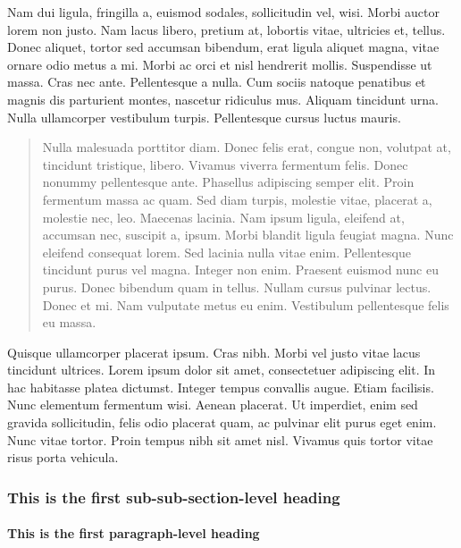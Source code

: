 Nam dui ligula, fringilla a, euismod sodales, sollicitudin vel, wisi. Morbi auctor
lorem non justo. Nam lacus libero, pretium at, lobortis vitae, ultricies et, tellus. Donec
aliquet, tortor sed accumsan bibendum, erat ligula aliquet magna, vitae ornare odio
metus a mi. Morbi ac orci et nisl hendrerit mollis. Suspendisse ut massa. Cras nec ante.
Pellentesque a nulla. Cum sociis natoque penatibus et magnis dis parturient montes,
nascetur ridiculus mus. Aliquam tincidunt urna. Nulla ullamcorper vestibulum turpis.
Pellentesque cursus luctus mauris.

\begin{quote}
Nulla malesuada porttitor diam. Donec felis erat, congue non, volutpat
at, tincidunt tristique, libero. Vivamus viverra fermentum felis. Donec
nonummy pellentesque ante. Phasellus adipiscing semper elit. Proin
fermentum massa ac quam. Sed diam turpis, molestie vitae, placerat
a, molestie nec, leo. Maecenas lacinia. Nam ipsum ligula, eleifend at,
accumsan nec, suscipit a, ipsum. Morbi blandit ligula feugiat magna.
Nunc eleifend consequat lorem. Sed lacinia nulla vitae enim. Pellentesque
tincidunt purus vel magna. Integer non enim. Praesent euismod nunc eu
purus. Donec bibendum quam in tellus. Nullam cursus pulvinar lectus.
Donec et mi. Nam vulputate metus eu enim. Vestibulum pellentesque
felis eu massa.
\end{quote}

Quisque ullamcorper placerat ipsum. Cras nibh. Morbi vel justo vitae lacus tincidunt
ultrices. Lorem ipsum dolor sit amet, consectetuer adipiscing elit. In hac habitasse
platea dictumst. Integer tempus convallis augue. Etiam facilisis. Nunc elementum
fermentum wisi. Aenean placerat. Ut imperdiet, enim sed gravida sollicitudin, felis
odio placerat quam, ac pulvinar elit purus eget enim. Nunc vitae tortor. Proin tempus
nibh sit amet nisl. Vivamus quis tortor vitae risus porta vehicula.

\subsubsection{This is the first sub-sub-section-level heading}

\lipsum[1]

\paragraph{This is the first paragraph-level heading}

